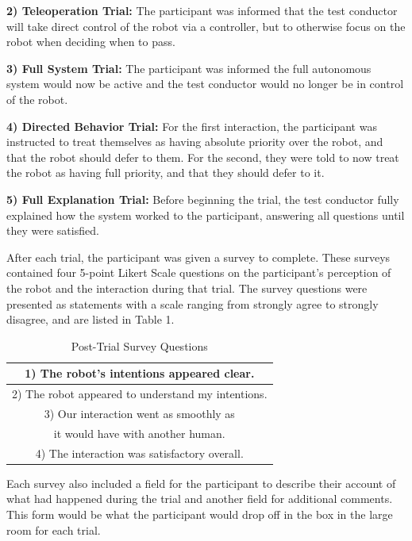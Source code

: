 \documentclass[letterpaper, 10 pt, conference]{ieeeconf}  %
\begin{document}
\textbf{2) Teleoperation Trial:} The participant was informed that the test conductor will take direct control of the robot via a controller, but to otherwise focus on the robot when deciding when to pass. 

\textbf{3) Full System Trial:} The participant was informed the full autonomous system would now be active and the test conductor would no longer be in control of the robot.

\textbf{4) Directed Behavior Trial:} For the first interaction, the participant was instructed to treat themselves as having absolute priority over the robot, and that the robot should defer to them. For the second, they were told to now treat the robot as having full priority, and that they should defer to it.

\textbf{5) Full Explanation Trial:} Before beginning the trial, the test conductor fully explained how the system worked to the participant, answering all questions until they were satisfied.

After each trial, the participant was given a survey to complete. These surveys contained four 5-point Likert Scale questions on the participant’s perception of the robot and the interaction during that trial. The survey questions were presented as statements with a scale ranging from strongly agree to strongly disagree, and are listed in Table 1.

\begin{table}[h]
\caption{Post-Trial Survey Questions}
\label{survey_questions}
\begin{center}
\begin{tabular}{|c|}
\hline
1) The robot’s intentions appeared clear.\\
\hline
2) The robot appeared to understand my intentions.\\
\hline
3) Our interaction went as smoothly as \\
it would have with another human.\\
\hline
4) The interaction was satisfactory overall.\\
\hline
\end{tabular}
\end{center}
\end{table}

Each survey also included a field for the participant to describe their account of what had happened during the trial and another field for additional comments. This form would be what the participant would drop off in the box in the large room for each trial.
\end{document}
